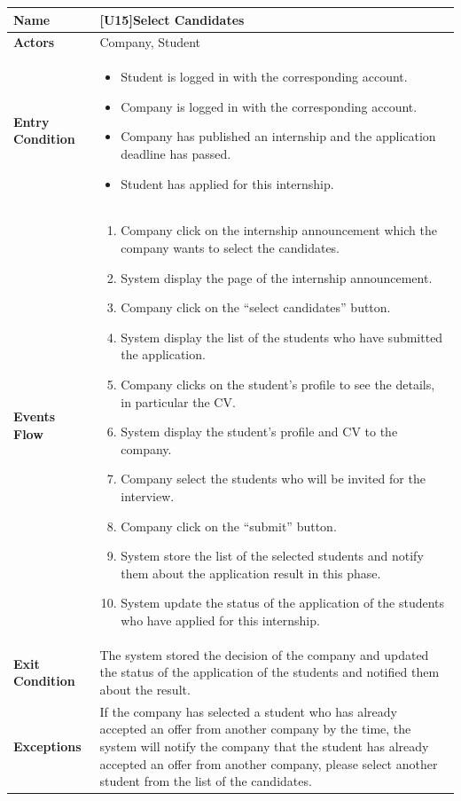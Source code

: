 \begin{center}
    \begin{tabular}{|p{9em}|p{27em}|}
        \hline
        \rowcolor{bluepoli!40} %
        \textbf{Name} & \textbf{[U15]Select Candidates} \\
        \hline
        \textbf{Actors} & Company, Student\\
        \hline
        \textbf{Entry Condition} & 
        \begin{itemize}
            \item Student is logged in with the corresponding account.
            \item Company is logged in with the corresponding account.
            \item Company has published an internship and the application deadline has passed.
            \item Student has applied for this internship.
        \end{itemize} \\
        \hline
        \textbf{Events Flow} & 
        \begin{enumerate}
            \item Company click on the internship announcement which the company wants to select the candidates.
            \item System display the page of the internship announcement.
            \item Company click on the ``select candidates'' button.
            \item System display the list of the students who have submitted the application.
            \item Company clicks on the student's profile to see the details, in particular the CV.
            \item System display the student's profile and CV to the company.
            \item Company select the students who will be invited for the interview.
            \item Company click on the ``submit'' button.
            \item System store the list of the selected students and notify them about the application result in this phase.
            \item System update the status of the application of the students who have applied for this internship.
        \end{enumerate} \\
        \hline
        \textbf{Exit Condition} & 
         The system stored the decision of the company and updated the status of the application of the students and notified them about the result.\\
        \hline
        \textbf{Exceptions} &
         If the company has selected a student who has already accepted an offer from another company by the time, the system will notify the company 
         that the student has already accepted an offer from another company, please select another student from the list of the candidates.


\end{tabular}
\end{center}

